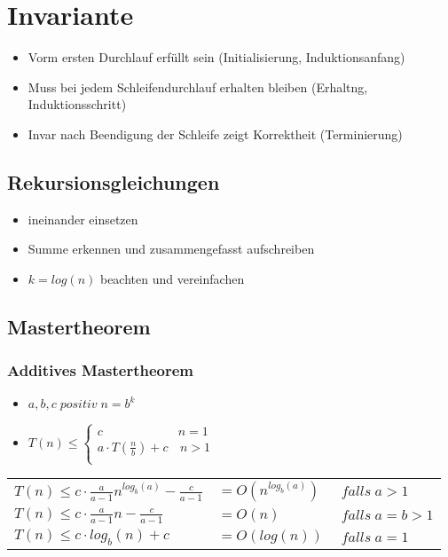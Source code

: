 \documentclass{article}
\begin{document}
\section{Invariante}
\begin{itemize}
\item Vorm ersten Durchlauf erf{\"u}llt sein (Initialisierung, Induktionsanfang)
\item Muss bei jedem Schleifendurchlauf erhalten bleiben (Erhaltng, Induktionsschritt)
\item Invar nach Beendigung der Schleife zeigt Korrektheit (Terminierung)
\end{itemize}

 
\subsection{Rekursionsgleichungen}
\begin{itemize}
\item ineinander einsetzen
\item Summe erkennen und zusammengefasst aufschreiben
\item $k=log(n)$ beachten und vereinfachen
\end{itemize}
\subsection{Mastertheorem}
\subsubsection{Additives Mastertheorem}
\begin{itemize}
\item $ a,b,c \; positiv \; n= b^k$
\item $T (n) \leq \left\{
\begin{array}{ll}
c & n  = 1 \\
a\cdot T(\frac{n}{b}) +c & \, n>1 \\
\end{array}
\right. $
\end{itemize}
\begin{tabular}{l l  l}

$T(n) \leq c\cdot \frac{a}{a-1}n^{log_b(a)} - \frac{c}{a-1}  $&$= O(n^{log_b(a)}) $&$ \; falls \; a>1$ \\
$T(n) \leq c\cdot \frac{a}{a-1}n - \frac{c}{a-1} $&$ = O(n)  $& $\; falls \; a=b>1$\\
$T(n) \leq c\cdot log_b(n) +c  $&$= O(log(n)) $&$\; falls \; a=1$\\
\end{tabular}
\end{document}
